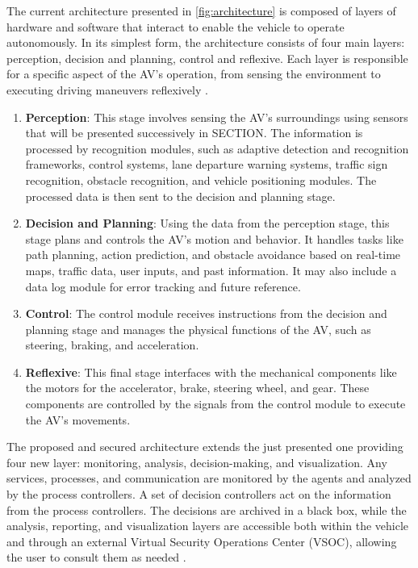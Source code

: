 The current architecture presented in \ref{fig:architecture} is composed of layers of hardware and software that interact to enable the vehicle to operate autonomously.
In its simplest form, the architecture consists of four main layers: perception, decision and planning, control and reflexive.
Each layer is responsible for a specific aspect of the AV's operation, from sensing the environment to executing driving maneuvers reflexively \cite{architecture} .

\begin{enumerate}
    \item \textbf{Perception}: This stage involves sensing the AV's surroundings using sensors that will be presented successively in SECTION. The information is processed by recognition modules, such as adaptive detection and recognition frameworks, control systems, lane departure warning systems, traffic sign recognition, obstacle recognition, and vehicle positioning modules.
    The processed data is then sent to the decision and planning stage.
    \item \textbf{Decision and Planning}: Using the data from the perception stage, this stage plans and controls the AV's motion and behavior.
    It handles tasks like path planning, action prediction, and obstacle avoidance based on real-time maps, traffic data, user inputs, and past information.
    It may also include a data log module for error tracking and future reference.
    \item \textbf{Control}: The control module receives instructions from the decision and planning stage and manages the physical functions of the AV, such as steering, braking, and acceleration.
    \item \textbf{Reflexive}: This final stage interfaces with the mechanical components like the motors for the accelerator, brake, steering wheel, and gear.
    These components are controlled by the signals from the control module to execute the AV’s movements.
\end{enumerate}

The proposed and secured architecture extends the just presented one providing four new layer: monitoring, analysis, decision-making, and visualization.
Any services, processes, and communication are monitored by the agents and analyzed by the process controllers.
A set of decision controllers act on the information from the process controllers.
The decisions are archived in a black box, while the analysis, reporting, and visualization layers are accessible both within the vehicle and through an external Virtual Security Operations Center (VSOC), allowing the user to consult them as needed \cite{adu-kyere2023self-aware} .

